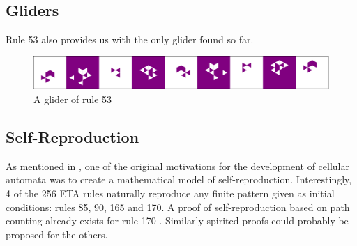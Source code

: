 \documentclass{article}
\begin{document}

\subsection{Gliders} \label{gliders}
Rule 53 also provides us with the only glider found so far.

\begin{figure}[H]
    \centering
        \includegraphics[width=1\textwidth]{graphics/behavior/gliders/glider.pdf}
    \caption{A glider of rule 53}
    \label{fig:glider}
\end{figure}

\pagebreak
\subsection{Self-Reproduction} \label{self-reproduction}

As mentioned in \cite{saadatCopyMachinesSelfreproduction2023}, one of the original motivations for the development of cellular automata was to create a mathematical model of self-reproduction. Interestingly, 4 of the 256 ETA rules naturally reproduce any finite pattern given as initial conditions: rules 85, 90, 165 and 170. A proof of self-reproduction based on path counting already exists for rule 170 \cite{saadatCopyMachinesSelfreproduction2023}. Similarly spirited proofs could probably be proposed for the others.

\vspace{.6cm}
\end{document}
